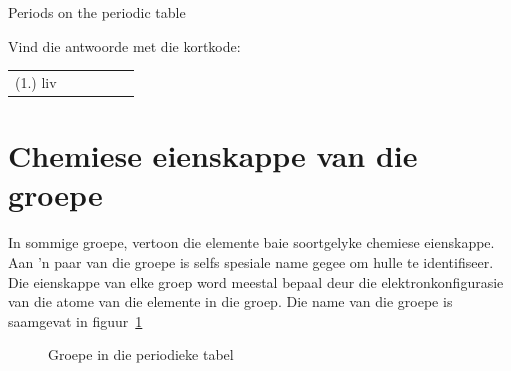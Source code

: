 \begin{exercises}{Periods on the periodic table}
\begin{enumerate}[noitemsep, label=\textbf{\arabic*}. ]
\begin{enumerate}[noitemsep, label=\textbf{\alph*}. ]
\end{enumerate}
\end{enumerate}
      \label{m38757*secfhsst!!!underscore!!!id936}
\par {} Vind die antwoorde met die kortkode:
 \par \begin{tabular}[h]{cccccc}
 (1.) liv  & \end{tabular}
\end{exercises}
\section{Chemiese eienskappe van die groepe}
 \label{m38760*secfhsst!!!underscore!!!id1062}
            \nopagebreak
            \label{m38760*id261554} In sommige groepe, vertoon die elemente baie soortgelyke chemiese eienskappe. Aan 'n paar van die groepe is selfs spesiale name gegee om hulle te identifiseer. Die eienskappe van elke groep word meestal bepaal deur die elektronkonfigurasie van die atome van die elemente in die groep. Die name van die groepe is saamgevat in figuur~\ref{fig:atom:periodic}\par
\begin{figure}[H]

\begin{center}
\end{center}

\caption{Groepe in die periodieke tabel}
\label{fig:atom:periodic}
\end{figure}  
